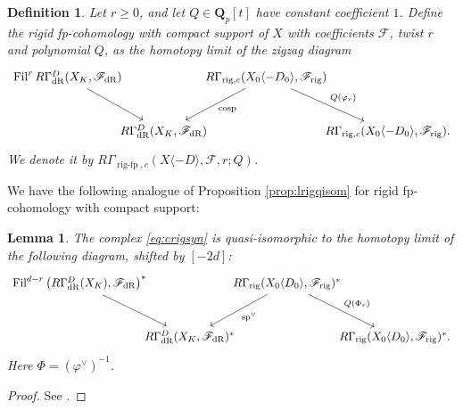 \documentclass[cjm]{ipart}
\theoremstyle{plain}
\newtheorem{lemma}[theorem]{Lemma}
\newtheorem{definition}[theorem]{Definition}
\theoremstyle{remark}
\DeclareMathOperator{\cosp}{cosp}
\DeclareMathOperator{\Fil}{Fil}
\DeclareMathOperator{\rigfp}{rig-fp}
\newcommand{\QQ}{\mathbf{Q}}
\newcommand{\Qp}{\QQ_p}
\newcommand{\dR}{\mathrm{dR}}
\newcommand{\rig}{\mathrm{rig}}
\newcommand{\sF}{\mathscr{F}}
\numberwithin{equation}{subsection}
\renewcommand{\geq}{\geqslant}
\begin{document}
   \begin{definition}
    Let $r\geq 0$, and let $Q\in\Qp[t]$ have constant coefficient $1$. Define the rigid fp-cohomology with compact support of $X$ with coefficients $\sF$,  twist $r$ and polynomial $Q$, as the homotopy limit of the zigzag diagram
    \begin{equation}
    \label{eq:crigsyn}
    \begin{tikzcd}[row sep=large, column sep=-1em]
     \Fil^r R\Gamma^D_{\dR}(X_K, \sF_{\dR}) 
     \arrow[rd] & 
     {} & 
     R\Gamma_{\rig,c}(X_0\langle -D_0\rangle, \sF_{\rig})
     \arrow[ld, "\cosp"]
     \arrow[rd, "Q(\varphi_r)"] \\
     {} &
     R\Gamma^D_{\dR}(X_K,\sF_{\dR}) & 
     {} & 
     R\Gamma_{\rig,c}(X_0\langle -D_0\rangle,\sF_{\rig}).
    \end{tikzcd}
    \end{equation}
     We denote it by  $R\Gamma_{\rigfp,c}(X\langle -D\rangle,\sF,r;Q)$.
   \end{definition}

   We have the following analogue of Proposition \ref{prop:lrigqisom} for rigid fp-cohomology with compact support:

   \begin{lemma}\label{lem:holorigfp}
    The complex \eqref{eq:crigsyn} is quasi-isomorphic to the homotopy limit of the following diagram, shifted by $[-2d]$:
    \[
    \begin{tikzcd}[row sep=large, column sep = -1em]
     \Fil^{d-r} \left(R\Gamma_{\dR}^D(X_K),\sF_{\dR}\right)^* \arrow[rd] &
     {} &
     R\Gamma_{\rig}(X_0\langle D_0\rangle,\sF_{\rig})^*
     \arrow[ld, "{\mathrm{sp}}^\vee"]
     \arrow[rd, "Q(\Phi_r)"] \\
     {} & 
     R\Gamma_{\dR}^D(X_K,\sF_{\dR})^*&
     {} & 
     R\Gamma_{\rig}(X_0\langle D_0\rangle,\sF_{\rig})^*.
   \end{tikzcd}   
   \]
   Here  $\Phi=(\varphi^\vee)^{-1}$.
   \end{lemma}
   \begin{proof}
    See \cite[\S 4]{besser12}.
   \end{proof}
\end{document}

